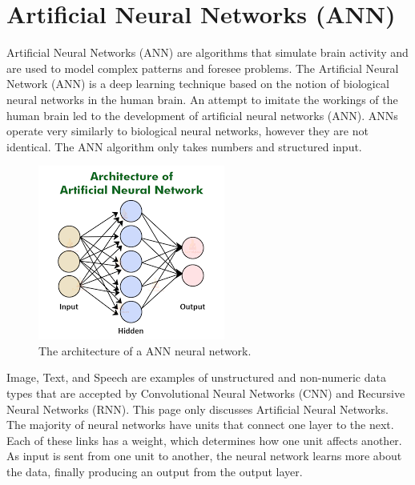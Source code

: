 \section{Artificial Neural Networks (ANN)}
Artificial Neural Networks (ANN) are algorithms that simulate brain activity and are used to model complex patterns and foresee problems. The Artificial Neural Network (ANN) is a deep learning technique based on the notion of biological neural networks in the human brain. An attempt to imitate the workings of the human brain led to the development of artificial neural networks (ANN). ANNs operate very similarly to biological neural networks, however they are not identical. The ANN algorithm only takes numbers and structured input.

\begin{figure}[ht]
    \centering
    \includegraphics[scale=1]{figures/ANN.png}
    \caption{The architecture of a ANN neural network.}
    \label{fig:chart_a}
\end{figure}

Image, Text, and Speech are examples of unstructured and non-numeric data types that are accepted by Convolutional Neural Networks (CNN) and Recursive Neural Networks (RNN). This page only discusses Artificial Neural Networks. The majority of neural networks have units that connect one layer to the next. Each of these links has a weight, which determines how one unit affects another. As input is sent from one unit to another, the neural network learns more about the data, finally producing an output from the output layer. 









